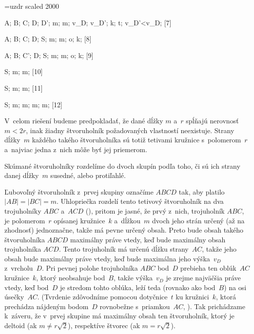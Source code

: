 {%
\font\zapf=uzdr scaled 2000

\fontplace
\rpoint A; \tpoint B; \lpoint C; \bpoint D;
\rBpoint D';
\lBpoint m; \rBpoint m;
\lpoint v_D; \lbpoint v_{D'};
\lBpoint k; \bpoint t; \lpoint v_{D'}<v_D;
[7] \hfil\Obr

\fontplace
\tpoint A; \tpoint B; \bpoint C; \bpoint D;
\tpoint S;
\bpoint m; \tpoint m; \bpoint o;
\rBpoint k;
[8]

\fontplace
\tpoint A; \tpoint B; \lpoint C'; \bpoint D;
\tpoint S;
\bpoint m; \rpoint m; \bpoint o;
\rBpoint k;
[9]

\fontplace
\lpoint S;
\tpoint m; \tpoint m;
[10]

\fontplace
\tpoint S;
\lpoint m; \rpoint m;
[11]

\fontplace
\lpoint S;
\bpoint m; \rpoint m;
\tpoint m; \lpoint m;
[12]

V~celom riešení budeme predpokladať, že dané dĺžky $m$ a~$r$
spĺňajú nerovnosť $m<2r$, inak žiadny štvoruholník požadovaných
vlastností neexistuje. Strany dĺžky~$m$ každého takého
štvoruholníka sú totiž tetivami kružnice s~polomerom~$r$
a~najviac jedna z~nich môže byť jej priemerom.

Skúmané štvoruholníky rozdelíme do dvoch skupín podľa toho, či
sú ich strany danej dĺžky~$m$ susedné, alebo protiľahlé.

\smallskip
Ľubovoľný štvoruholník z~prvej skupiny označíme $ABCD$ tak, aby
platilo $|AB|=|BC|=m$. Uhlopriečka rozdelí tento tetivový
štvoruholník na dva trojuholníky $ABC$ a~$ACD$ (\obr), pritom je
\inspicture{}
jasné, že prvý z~nich, trojuholník $ABC$, je polo\-merom~$r$
opísanej kružnice~$k$ a~dĺžkou~$m$ dvoch jeho strán určený (až na
zhodnosť) jednoznačne, takže má pevne určený obsah. Preto bude
obsah takého štvoruholníka $ABCD$ maximálny práve vtedy, keď bude
maximálny obsah trojuholníka $ACD$. Tento trojuholník má určenú
dĺžku strany~$AC$, takže jeho obsah bude maximálny práve vtedy, keď
bude maximálna jeho výška~$v_D$ z~vrcholu~$D$. Pri pevnej polohe
trojuholníka $ABC$ bod~$D$ prebieha ten oblúk~$AC$ kružnice~$k$,
ktorý neobsahuje bod~$B$, takže výška~$v_D$ je zrejme najväčšia
práve vtedy, keď bod~$D$ je stredom tohto oblúka, leží teda (rovnako
ako bod~$B$) na osi úsečky~$AC$. (Tvrdenie zdôvodníme pomocou
dotyčnice~$t$ ku kružnici~$k$, ktorá prechádza nájdeným bodom~$D$
rovnobežne s~priamkou~$AC$, ). Tak prichádzame k~záveru, že
v~prvej skupine má maximálny obsah ten štvoruholník, ktorý je
deltoid (ak $m\ne r\sqrt2$), respektíve štvorec (ak $m=r\sqrt2$).

}
